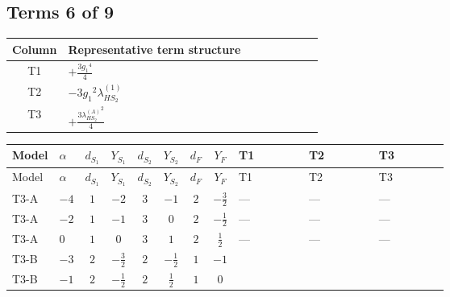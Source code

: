 \documentclass[8pt]{article}
\begin{document}
\begin{landscape}
\subsection*{Terms 6 of 9}
\begin{center}
\begin{tabular}{@{}c >{\raggedright\arraybackslash}p{0.82\linewidth}@{}}
\toprule
Column & Representative term structure \\
\midrule
T1 & \(\displaystyle +\frac{3 {g_1}^4}{4}\) \\
\midrule
T2 & \(\displaystyle -3 {g_1}^2 {\lambda_{HS_2}^{(1)}}\) \\
\midrule
T3 & \(\displaystyle +\frac{3 {\lambda_{HS_2}^{(A)}}^2}{4}\) \\
\midrule
\bottomrule
\end{tabular}
\end{center}
\smallskip
\tiny
\begin{longtable}{@{}llcccccc >{\raggedright\arraybackslash}p{0.21\linewidth} >{\raggedright\arraybackslash}p{0.21\linewidth} >{\raggedright\arraybackslash}p{0.21\linewidth}@{}}
\toprule
Model & $\alpha$ & $d_{S_1}$ & $Y_{S_1}$ & $d_{S_2}$ & $Y_{S_2}$ & $d_F$ & $Y_F$ & T1 & T2 & T3 \\
\midrule
\endfirsthead
\toprule
Model & $\alpha$ & $d_{S_1}$ & $Y_{S_1}$ & $d_{S_2}$ & $Y_{S_2}$ & $d_F$ & $Y_F$ & T1 & T2 & T3 \\
\midrule
\endhead
T3-A & $-4$ & $1$ & $-2$ & $3$ & $-1$ & $2$ & $-\frac{3}{2}$ & --- & --- & --- \\
\midrule
T3-A & $-2$ & $1$ & $-1$ & $3$ & $0$ & $2$ & $-\frac{1}{2}$ & --- & --- & --- \\
\midrule
T3-A & $0$ & $1$ & $0$ & $3$ & $1$ & $2$ & $\frac{1}{2}$ & --- & --- & --- \\
\midrule
T3-B & $-3$ & $2$ & $-\frac{3}{2}$ & $2$ & $-\frac{1}{2}$ & $1$ & $-1$ & \scriptsize\adjustbox{max width=\linewidth}{$\begin{gathered} +\frac{3 {g_1}^4}{4}\end{gathered}$} & \scriptsize\adjustbox{max width=\linewidth}{$\begin{gathered} -3 {g_1}^2 {\lambda_{HS_2}^{(1)}}\end{gathered}$} & \scriptsize\adjustbox{max width=\linewidth}{$\begin{gathered} +\frac{3 {\lambda_{HS_2}^{(A)}}^2}{4}\end{gathered}$} \\
\midrule
T3-B & $-1$ & $2$ & $-\frac{1}{2}$ & $2$ & $\frac{1}{2}$ & $1$ & $0$ & \scriptsize\adjustbox{max width=\linewidth}{$\begin{gathered} +\frac{3 {g_1}^4}{4}\end{gathered}$} & \scriptsize\adjustbox{max width=\linewidth}{$\begin{gathered} -3 {g_1}^2 {\lambda_{HS_2}^{(1)}}\end{gathered}$} & \scriptsize\adjustbox{max width=\linewidth}{$\begin{gathered} +\frac{3 {\lambda_{HS_2}^{(A)}}^2}{4}\end{gathered}$} \\

\end{longtable}
\end{landscape}
\end{document}
